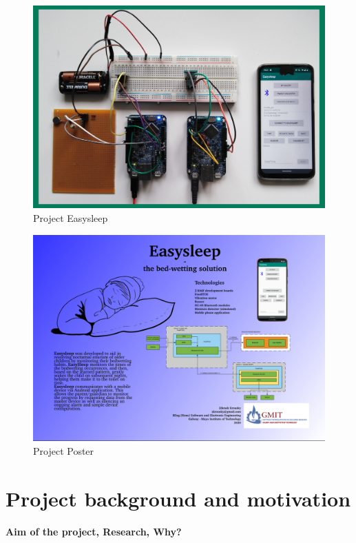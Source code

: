 \documentclass[12pt,a4paper]{article}
\begin{document}
	\null
	\vfill
	\begin{figure}[h]
	 \centering
	 \includegraphics[width=\textwidth]{project1_with.jpg}
	 \caption{Project Easysleep}
     \label{fig:projectPicture}
    \end{figure}
    \vfill
    \newpage

	\tableofcontents
	\newpage
	
    \begin{figure}[!ht]
     \centering
     \includegraphics[width=0.9\textheight, angle=90]{poster1.png}
     \caption{Project Poster}
     \label{fig:projectPoster1}
    \end{figure}
    \newpage
    
	\section{Project background and motivation}
	{\bfseries Aim of the project, Research, Why?}\\
	
\end{document}
